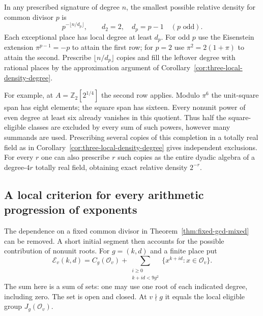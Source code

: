 \documentclass[11pt,letterpaper]{article}
\theoremstyle{definition}
\numberwithin{equation}{section}
\begin{document}
In any prescribed signature of degree $n$, the smallest possible
relative density for common divisor $p$ is
\[
                  p^{-\lfloor n/d_p\rfloor},\qquad
               d_2=2,\quad d_p=p-1\quad(p\text{ odd}).
\]
Each exceptional place has local degree at least $d_p$. For odd $p$
use the Eisenstein extension $\pi^{p-1}=-p$ to attain the first
row; for $p=2$ use $\pi^2=2(1+\pi)$ to attain the second. Prescribe
$\lfloor n/d_p\rfloor$ copies and fill the leftover degree with rational
places by the approximation argument of
Corollary~\ref{cor:three-local-density-degree}.

For example, at $A=\mathbb Z_2[2^{1/4}]$ the second row applies.
Modulo $\pi^6$ the unit-square span has eight elements; the square
span has sixteen. Every nonunit power of even degree at least six
already vanishes in this quotient. Thus half the square-eligible
classes are excluded by every sum of such powers, however many
summands are used. Prescribing several copies of this completion
in a totally real field as in Corollary~\ref{cor:three-local-density-degree}
gives independent exclusions. For every $r$ one can also prescribe
$r$ such copies as the entire dyadic algebra of a degree-$4r$
totally real field, obtaining exact relative density $2^{-r}$.

\subsection{A local criterion for every arithmetic progression of exponents}
\label{sec:nf-mixed-criterion}
The dependence on a fixed common divisor in
Theorem~\ref{thm:fixed-gcd-mixed} can be removed. A short initial
segment then accounts for the possible contribution of nonunit roots.
For $g=(k,d)$ and a finite place put
\[
 \mathcal E_v(k,d)=C_g(\mathcal O_v)+
     \sum_{\substack{i\ge0\\ k+id<9g^2}}
                   \{x^{k+id}:x\in\mathcal O_v\}.
\]
The sum here is a sum of sets: one may use one root of each indicated
degree, including zero. The set is open and closed. At $v\nmid g$
it equals the local eligible group $J_g(\mathcal O_v)$.
\end{document}
